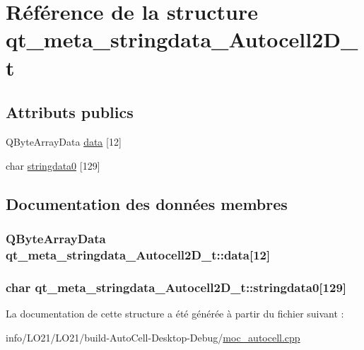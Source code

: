 \hypertarget{structqt__meta__stringdata___autocell2_d__t}{}\section{Référence de la structure qt\+\_\+meta\+\_\+stringdata\+\_\+\+Autocell2\+D\+\_\+t}
\label{structqt__meta__stringdata___autocell2_d__t}
\subsection*{Attributs publics}
\begin{DoxyCompactItemize}
\item 
Q\+Byte\+Array\+Data \hyperlink{structqt__meta__stringdata___autocell2_d__t_a638a1507442e609739b5de7f12377002}{data} \mbox{[}12\mbox{]}
\item 
char \hyperlink{structqt__meta__stringdata___autocell2_d__t_abb1f63b6d95e8f7dfa1925caf0601041}{stringdata0} \mbox{[}129\mbox{]}
\end{DoxyCompactItemize}


\subsection{Documentation des données membres}
\subsubsection[{\texorpdfstring{data}{data}}]{\setlength{\rightskip}{0pt plus 5cm}Q\+Byte\+Array\+Data qt\+\_\+meta\+\_\+stringdata\+\_\+\+Autocell2\+D\+\_\+t\+::data\mbox{[}12\mbox{]}}\hypertarget{structqt__meta__stringdata___autocell2_d__t_a638a1507442e609739b5de7f12377002}{}\label{structqt__meta__stringdata___autocell2_d__t_a638a1507442e609739b5de7f12377002}
\subsubsection[{\texorpdfstring{stringdata0}{stringdata0}}]{\setlength{\rightskip}{0pt plus 5cm}char qt\+\_\+meta\+\_\+stringdata\+\_\+\+Autocell2\+D\+\_\+t\+::stringdata0\mbox{[}129\mbox{]}}\hypertarget{structqt__meta__stringdata___autocell2_d__t_abb1f63b6d95e8f7dfa1925caf0601041}{}\label{structqt__meta__stringdata___autocell2_d__t_abb1f63b6d95e8f7dfa1925caf0601041}


La documentation de cette structure a été générée à partir du fichier suivant \+:\begin{DoxyCompactItemize}
\item 
info/\+L\+O21/\+L\+O21/build-\/\+Auto\+Cell-\/\+Desktop-\/\+Debug/\hyperlink{moc__autocell_8cpp}{moc\+\_\+autocell.\+cpp}\end{DoxyCompactItemize}
